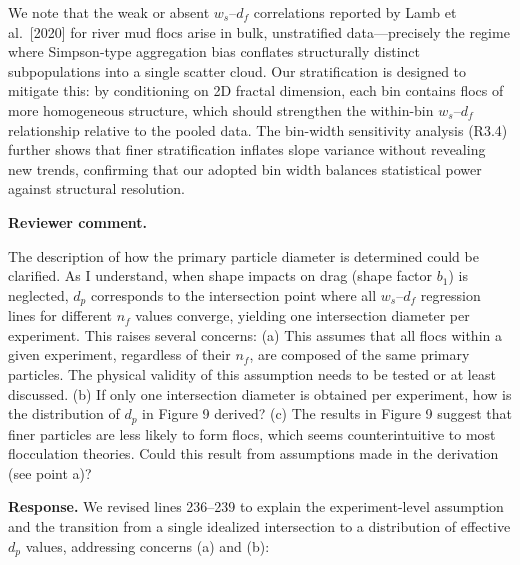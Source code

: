 \documentclass[11pt]{article}
\newenvironment{Snippet}{%
  \par\vspace{0.3em}\begin{list}{}{\setlength{\leftmargin}{1em}\setlength{\rightmargin}{0.5em}}\item\small\itshape
}{%
  \end{list}\vspace{0.3em}
}
\begin{document}
\begin{enumerate}[label=\textbf{R3.\arabic*.}]
\begin{Snippet}
\end{Snippet}
We note that the weak or absent $w_s$--$d_f$ correlations reported by Lamb et al.\ [2020] for river mud flocs arise in bulk, unstratified data---precisely the regime where Simpson-type aggregation bias conflates structurally distinct subpopulations into a single scatter cloud. Our stratification is designed to mitigate this: by conditioning on 2D fractal dimension, each bin contains flocs of more homogeneous structure, which should strengthen the within-bin $w_s$--$d_f$ relationship relative to the pooled data. The bin-width sensitivity analysis (R3.4) further shows that finer stratification inflates slope variance without revealing new trends, confirming that our adopted bin width balances statistical power against structural resolution.

\item \textbf{Reviewer comment.}
\begin{Snippet}
The description of how the primary particle diameter is determined could be clarified. As I understand, when shape impacts on drag (shape factor $b_1$) is neglected, $d_p$ corresponds to the intersection point where all $w_s$--$d_f$ regression lines for different $n_f$ values converge, yielding one intersection diameter per experiment. This raises several concerns: (a) This assumes that all flocs within a given experiment, regardless of their $n_f$, are composed of the same primary particles. The physical validity of this assumption needs to be tested or at least discussed. (b) If only one intersection diameter is obtained per experiment, how is the distribution of $d_p$ in Figure 9 derived? (c) The results in Figure 9 suggest that finer particles are less likely to form flocs, which seems counterintuitive to most flocculation theories. Could this result from assumptions made in the derivation (see point a)?
\end{Snippet}
\textbf{Response.}
We revised lines 236--239 to explain the experiment-level assumption and the transition from a single idealized intersection to a distribution of effective $d_p$ values, addressing concerns (a) and (b):
\begin{Snippet}

\end{Snippet}
\end{enumerate}
\end{document}
